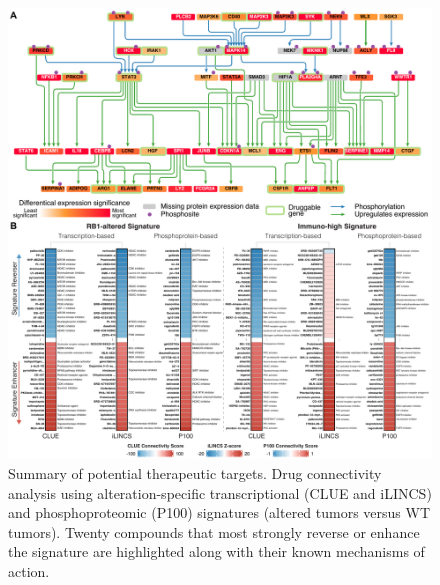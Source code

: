 \begin{figure}[tb]
    \centering
    \includegraphics[width=\linewidth]{figures/chap04_cptac_gbm_discov/figures7_pathway_druggability.pdf}
    \caption[Summary of potential therapeutic targets.]{%
        Summary of potential therapeutic targets. Drug connectivity analysis using alteration-specific transcriptional (CLUE and iLINCS) and phosphoproteomic (P100) signatures (altered tumors versus WT tumors). Twenty compounds that most strongly reverse or enhance the signature are highlighted along with their known mechanisms of action.
    }
    \label{fig:gbm-druggability}
\end{figure}


